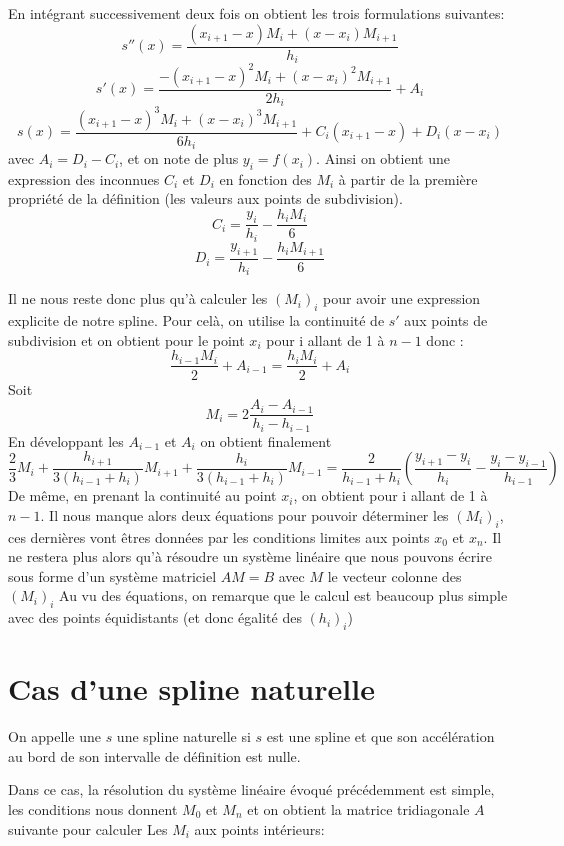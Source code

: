 En intégrant successivement deux fois on obtient les trois formulations suivantes:
\[
s''(x) = \frac{(x_{i+1} - x)M_i + (x - x_i)M_{i+1}}{h_i}
\]
\[
s'(x) = \frac{-(x_{i+1} - x)^{2}M_i + (x - x_i)^{2}M_{i+1}}{2h_i} + A_i
\]
\[
s(x) = \frac{(x_{i+1} - x)^{3}M_i + (x - x_i)^{3}M_{i+1}}{6h_i} + C_i(x_{i+1}-x) +D_i(x-x_i)
\]
avec $A_i = D_i - C_i$, et on note de plus $y_i = f(x_i)$. Ainsi on obtient une expression des inconnues $C_i$ et $D_i$
en fonction des $M_i$ à partir de la première propriété de la définition (les valeurs aux points de subdivision).
\[
C_i = \frac{y_i}{h_i} - \frac{h_iM_i}{6}
\]
\[
D_i = \frac{y_{i+1}}{h_i} - \frac{h_iM_{i+1}}{6}
\]

Il ne nous reste donc plus qu'à calculer les $(M_i)_i$ pour avoir une expression explicite de notre spline.
Pour celà, on utilise la continuité de $s'$ aux points de subdivision et on obtient pour le point $x_{i}$ pour i allant de 1 à $n-1$ donc :
\[
\frac{h_{i-1}M_{i}}{2} + A_{i-1} = \frac{h_{i}M_{i}}{2} + A_{i}
\]
Soit
\[
{M_{i}} = 2\frac{A_{i}-A_{i-1}}{h_{i}-h_{i-1}}
\]
En développant les $A_{i-1}$ et $A_{i}$ on obtient finalement
\[
\frac{2}{3}M_{i} +\frac{h_{i+1}}{3(h_{i-1}+h_{i})}M_{i+1}+\frac{h_{i}}{3(h_{i-1}+h_{i})}M_{i-1} = \frac{2}{h_{i-1}+h_{i}} (\frac{y_{i+1} - y_{i}}{h_{i}} - \frac{y_{i} - y_{i-1}}{h_{i-1}})
\]
De même, en prenant la continuité au point $x_i$, on obtient pour i allant de 1 à $n-1$.
Il nous manque alors deux équations pour pouvoir déterminer les $(M_i)_i$,
ces dernières vont êtres données par les conditions limites aux points $x_0$ et $x_n$.
Il ne restera plus alors qu'à résoudre un système linéaire que nous pouvons écrire sous forme d'un système matriciel $AM = B$
avec $M$ le vecteur colonne des $(M_i)_i$
Au vu des équations, on remarque que le calcul est beaucoup plus simple avec des points équidistants (et donc égalité des $(h_i)_i$)

\section{Cas d'une spline naturelle}

\begin{definition}
On appelle une $s$ une spline naturelle si $s$ est une spline et que
son accélération au bord de son intervalle de définition est nulle.
\end{definition}

Dans ce cas, la résolution du système linéaire évoqué précédemment est simple,
les conditions nous donnent $M_0$ et $M_n$ et on obtient la matrice tridiagonale
$A$ suivante pour calculer Les $M_i$ aux points intérieurs:

